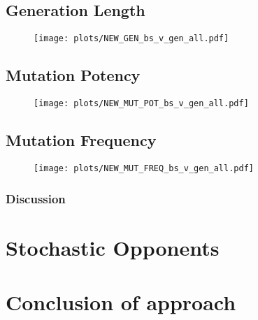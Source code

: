\subsection{Generation Length}\label{subsec:generationLength}
\begin{figure}[h]
    \texttt{[image: plots/NEW\_GEN\_bs\_v\_gen\_all.pdf]}
    \caption{}\label{fig:NEW-GEN-bs-v-gen-all}
\end{figure}

\subsection{Mutation Potency}\label{subsec:mutationPotency}
\begin{figure}[h]
    \texttt{[image: plots/NEW\_MUT\_POT\_bs\_v\_gen\_all.pdf]}
    \caption{}\label{fig:NEW-MUT-POT-bs-v-gen-all}
\end{figure}

\subsection{Mutation Frequency}\label{subsec:mutationFrequency}
\begin{figure}[h]
    \texttt{[image: plots/NEW\_MUT\_FREQ\_bs\_v\_gen\_all.pdf]}
    \caption{}\label{fig:NEW-MUT-FREQ-bs-gen-all}
\end{figure}
\subsubsection{Discussion}\label{subsubsec:discussion}

\section{Stochastic Opponents}\label{sec:stochasticOpponents}

\section{Conclusion of approach}\label{sec:conclusionOfApproach}